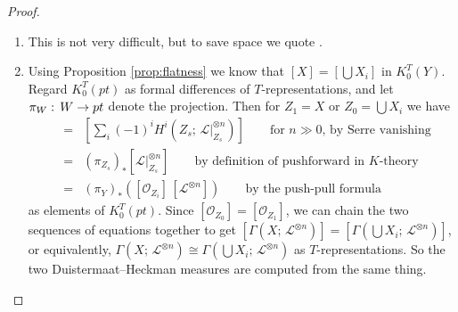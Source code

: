 \documentclass[11pt]{amsart}
\theoremstyle{definition}
\newcommand{\AK}[1]{\textcolor{darkgreen}{[AK: #1]}}
\DeclareMathOperator{\wt}{wt}
\newcommand{\RR}{\mathbb{R}}
\newcommand{\PP}{\mathbb{P}}
\newcommand\Union\bigcup
\newcommand\lie[1]{{\mathfrak #1}}
\newcommand\FF{{\mathbb F}}
\newcommand\tensor\otimes
\newcommand\calO{{\mathcal O}}
\newcommand\calL{{\mathcal L}}
\newcommand\into\hookrightarrow
\newcommand\onto\twoheadrightarrow
\newcommand\iso\cong
\newcommand\junk[1]{}
\newcommand\actson\circlearrowright
\renewcommand{\colon}{\mathrel{:}}
\renewcommand{\colon}{:\mkern\thinmuskip}
\begin{document}
\begin{proof}
\begin{enumerate}
{    \AK{Should cut this down using Lemma \ref{lem:fixedPoints}}
    It remains to show that if $T$ acts faithfully, then
    $\dim_\RR \Phi_T(X,\calL) = \dim T$. Obviously we have $\leq$ because
    $\Phi_T(X,\calL) \subseteq \lie t_\RR^*$. If the dimension is strictly less,
    then $\Phi_T(X,\calL)$ is contained in some rational affine hyperplane
    $H \leq \lie t_\RR^*$, perpendicular to a subtorus $S \into T$ of
    dimension $1$.
    \junk{Using the $\tensor \FF_\lambda$ trick above we can assume that $H \ni \vec 0$}
    So $S$ acts with the same weight on every line $\calL_p$ over a
    $T$-fixed point. Since the action is assumed faithful for $T$, hence
    faithful for $S$, there exists $x \in X$ a non-fixed point.

    Assume briefly that the curve $\Sigma := \overline{S\cdot x}$ is normal, in which
    case it is a $\PP^1$ (no higher genus curve possesses a faithful $S$-action).
    Since $\calL$ is ample on this $\PP^1$, it is $\calO(j)$ for some $j\neq 0$
    (in fact $j>0$).
    Let $\mu = \wt(S\actson T_0 \Sigma)$, which is not $\vec 0$ because
    $S$ acts faithfully on $\Sigma$,
    and perform the fundamental calculation
    $\wt(T\actson T_\infty \Sigma)-\wt(T\actson T_0 \Sigma) = j \mu \neq \vec 0$.
    This contradicts the statement above that $S$ acts with the same weight
    on each $\calL_p$. 

    If $\overline{S\cdot x}$ is not normal, then take $\Sigma$ instead to
    be its normalization $\Sigma \onto \overline{S\cdot x}$ and run the
    same argument.
    }
  \item This is not very difficult, but to save space we quote
    \cite[Theorem 9.8]{baumann2021mirkovic}.
  \item \label{item:Kproof}
    Using Proposition \ref{prop:flatness} we know
    that $[X] = [\Union X_i]$ in $K_0^T(Y)$. Regard $K_0^T(pt)$ as formal
    differences of $T$-representations, and let $\pi_W\colon W\to pt$
    denote the projection. Then for $Z_1 = X$ or $Z_0 = \Union X_i$ we have
    \begin{eqnarray*}
      [\Gamma(Z_s;\, \calL^{\tensor n})]
      &=& \left[ \sum_i (-1)^i H^i(Z_s;\, \calL|_{Z_s}^{\tensor n})\right]
          \qquad\text{for $n\gg 0$, by Serre vanishing} \\
      &=& (\pi_{Z_s})_* [\calL|_{Z_s}^{\tensor n}]
          \qquad\text{by definition of pushforward in $K$-theory} \\
      &=& (\pi_Y)_*\left( [\calO_{Z_i}]\, [\calL^{\tensor n}] \right)
          \qquad\text{by the push-pull formula} 
    \end{eqnarray*}
    as elements of $K_0^T(pt)$. Since $[\calO_{Z_0}] = [\calO_{Z_1}]$,
    we can chain the two sequences of equations together to get
    $[\Gamma(X;\, \calL^{\tensor n})] = [\Gamma(\Union X_i;\, \calL^{\tensor n})]$,
    or equivalently,
    $\Gamma(X;\, \calL^{\tensor n}) \iso \Gamma(\Union X_i;\, \calL^{\tensor n})$
    as $T$-representations. So the two Duistermaat--Heckman measures
    are computed from the same thing.


\end{enumerate}
\end{proof}
\end{document}
